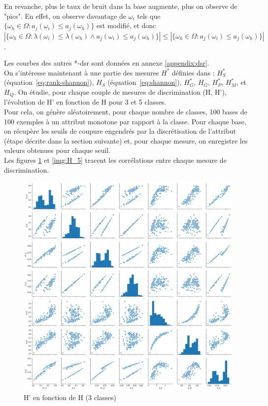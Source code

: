 \documentclass[a4paper]{article}
\renewcommand{\eqref}[1]{équation~\ref{#1}}
\begin{document}
\noindent En revanche, plus le taux de bruit dans la base augmente, plus on observe de
"pics". En effet, on observe davantage de $\omega_i$ tels que $ \{\omega_h \in
\Omega : a_j(\omega_i) \leq a_j(\omega_h)\} $ est modifié, et donc  $|
\{\omega_h \in \Omega : \lambda(\omega_i) \leq \lambda(\omega_h) \land
a_j(\omega_i) \leq a_j(\omega_h)\} | \leq | \{\omega_h \in \Omega :
a_j(\omega_i) \leq a_j(\omega_h)\} |$.

\noindent Les courbes des autres *-dsr sont données en annexe \ref{appendix:dsr}.\\

On s'intéresse maintenant à une partie des mesures $H^*$ définies dans
\cite{marsala-rank} : $H^*_S$ (\eqref{eq:rank-shannon}), $H_S$
(\eqref{eq:shannon}), $H^*_G$, $H_G$, $H^*_P$, $H^*_M$, et $H_Q$. On étudie,
pour chaque couple de mesures de discrimination (H, H'), l'évolution de H' en
fonction de H pour 3 et 5 classes.  \\ Pour cela, on génère aléatoirement, pour
chaque nombre de classes, 100 bases de 100 exemples à un attribut monotone par
rapport à la classe. Pour chaque base, on récupère les seuils de coupure
engendrés par la discrétisation de l'attribut (étape décrite dans la section
suivante) et, pour chaque mesure, on enregistre les valeurs obtenues pour chaque
seuil.\\ Les figures \ref{img:H_3} et \ref{img:H_5} tracent les corrélations
entre chaque mesure de discrimination. \\

\begin{figure}[H]
	\center 
	\includegraphics[width=1\textwidth]{images/H_3.png}
    \caption{H' en fonction de H (3 classes)}
    \label{img:H_3}
\end{figure}
\end{document}
